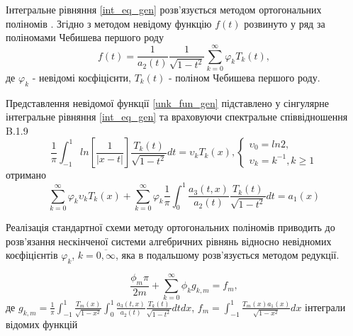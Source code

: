 Інтегральне рівняння \eqref{int_eq_gen} розв'язується методом ортогональних поліномів \cite{popov_3}.
Згідно з методом невідому функцію $f(t)$ розвинуто у ряд за поліномами Чебишева першого роду
\begin{equation}\label{unk_fun_gen}
    f(t) = \frac{1}{a_2(t)} \frac{1}{\sqrt{1 - t^2}} \sum_{k=0}^{\infty} \varphi_k T_{k}(t),
\end{equation}
де $\varphi_k$ - невідомі коєфіцієнти, $T_{k}(t)$ - поліном Чебишева першого роду.

Представлення невідомої функції \eqref{unk_fun_gen} підставлено у сінгулярне інтегральне рівняння \eqref{int_eq_gen}
та враховуючи спектральне співвідношення B.1.9 \cite{ortogonal}
\begin{equation}
    \frac{1}{\pi} \int_{-1}^{1} ln\left[ \frac{1}{\lvert x - t \rvert} \right] \frac{T_k(t)}{\sqrt{1 - t^2}} dt = \upsilon_k T_k(x),
    \begin{cases}
        \upsilon_0 = ln 2, \\
        \upsilon_k = k^{-1}, k \ge 1
    \end{cases}
\end{equation} 
отримано
\begin{equation}\label{int_eq_2_gen}
    \sum_{k=0}^{\infty}  \varphi_k \upsilon_k T_{k}( x ) + \sum_{k=0}^{\infty} \varphi_k \frac{1}{\pi} \int_{0}^{1} \frac{a_3(t, x)}{a_2(t)} \frac{T_{k}(t)}{\sqrt{1 - t^2}} dt = a_1(x)
\end{equation}

Реалізація стандартної схеми методу ортогональних поліномів приводить до розв'язання нескінченої системи алгебричних рівнянь відносно невідномих коєфіцієнтів $\varphi_k$, $k=\overline{0, \infty}$,
яка в подальшому розв'язується методом редукції.

\begin{equation}\label{int_system_gen}
    \frac{\phi_m \pi}{2m} + \sum_{k=0}^{\infty} \phi_k g_{k, m} = f_m,
\end{equation}
де $g_{k, m} = \frac{1}{\pi} \int_{-1}^{1} \frac{T_{m}(x)}{\sqrt{1 - x^2}} \int_{0}^{1} \frac{a_3(t, x )}{a_2(t)} \frac{T_{k}(t)}{\sqrt{1 - t^2}} dt dx$,
$f_m = \int_{-1}^{1} \frac{T_{m}(x) a_1(x)}{\sqrt{1 - x^2}} dx$ інтеграли відомих функцій



